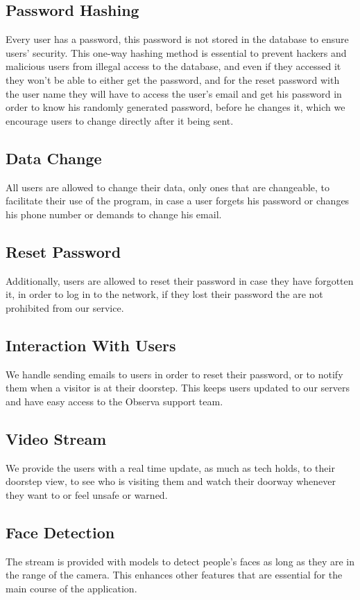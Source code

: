 \documentclass[a4 paper, 12pt]{article}
\begin{document}
\subsection{Password Hashing}
Every user has a password, this password is not stored in the database to ensure users' security. This one-way hashing method is essential to prevent hackers and malicious users from illegal access to the database, and even if they accessed it they won't be able to either get the password, and for the reset password with the user name they will have to access the user's email and get his password in order to know his randomly generated password, before he changes it, which we encourage users to change directly after it being sent.
\subsection{Data Change}
All users are allowed to change their data, only ones that are changeable, to facilitate their use of the program, in case a user forgets his password or changes his phone number or demands to change his email.
\subsection{Reset Password}
Additionally, users are allowed to reset their password in case they have forgotten it, in order to log in to the network, if they lost their password the are not prohibited from our service.
\subsection{Interaction With Users}
We handle sending emails to users in order to reset their password, or to notify them when a visitor is at their doorstep. This keeps users updated to our servers and have easy access to the Observa support team.
\subsection{Video Stream}
We provide the users with a real time update, as much as tech holds, to their doorstep view, to see who is visiting them and watch their doorway whenever they want to or feel unsafe or warned.
\subsection{Face Detection}
The stream is provided with models to detect people's faces as long as they are in the range of the camera. This enhances other features that are essential for the main course of the application.
\end{document}
